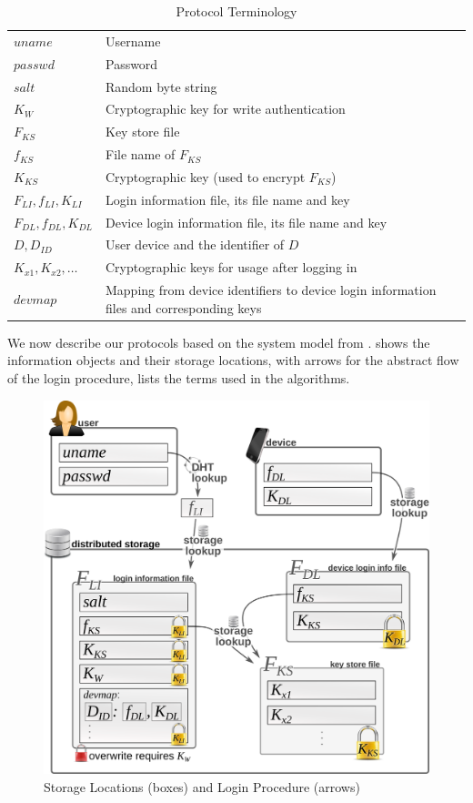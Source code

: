 \begin{table}[htb]
\centering
\caption{Protocol Terminology}
    \begin{tabular}{lp{5.92cm}}
 		\toprule
		$uname$ & Username\\
		$passwd$ & Password\\
		$salt$ & Random byte string\\
		$K_W$ & Cryptographic key for write authentication \\
		$F_{KS}$ & Key store file\\
		$f_{KS}$ & File name of $F_{KS}$\\
		$K_{KS}$ & Cryptographic key (used to encrypt $F_{KS}$)\\
		$F_{LI}, f_{LI}, K_{LI}$ & Login information file, its file name and key\\
		$F_{DL}, f_{DL}, K_{DL}$ & Device login information file, its file name and key\\
		$D, D_{ID}$ & User device and the identifier of $D$\\
		$K_{x1}, K_{x2}, \dots$ & Cryptographic keys for usage after logging in\\
		$devmap$ & Mapping from device identifiers to device login information files and corresponding keys\\
		\bottomrule
    \end{tabular}
\end{table}

We now describe our protocols based on the system model from
.   shows the
information objects and their storage locations, with arrows for the
abstract flow of the login procedure,  lists the terms
used in the algorithms.

\begin{figure}
  \centering
	\includegraphics[width=.88\textwidth]{images/passwords-peer-to-peer/user-files-devices}
  \caption{Storage Locations (boxes) and Login Procedure (arrows)}
\end{figure}

